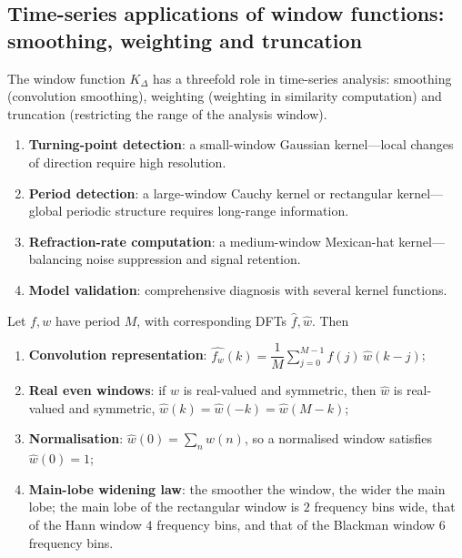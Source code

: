 \subsection{Time-series applications of window functions: smoothing, weighting and truncation}\label{sec:window_function_ts_app}
\begin{definition}\label{def:ts_window_function}
The window function $K_\Delta$ has a threefold role in time-series analysis: smoothing (convolution smoothing), weighting (weighting in similarity computation) and truncation (restricting the range of the analysis window).
\end{definition}

\begin{proposition}\label{prop:ts_window_selection}
\begin{enumerate}[label=(\roman*)]
    \item \textbf{Turning-point detection}: a small-window Gaussian kernel---local changes of direction require high resolution.
    \item \textbf{Period detection}: a large-window Cauchy kernel or rectangular kernel---global periodic structure requires long-range information.
    \item \textbf{Refraction-rate computation}: a medium-window Mexican-hat kernel---balancing noise suppression and signal retention.
    \item \textbf{Model validation}: comprehensive diagnosis with several kernel functions.
\end{enumerate}
\end{proposition}
\begin{proposition}\label{prop:window_spectrum_properties_parallel}
Let $f,w$ have period $M$, with corresponding DFTs $\hat f,\hat w$. Then
\begin{enumerate}[label=(\roman*)]
    \item \textbf{Convolution representation}: $\widehat{f_w}(k)=\dfrac1M\displaystyle\sum_{j=0}^{M-1}\hat f(j)\,\hat w(k-j)$;
    \item \textbf{Real even windows}: if $w$ is real-valued and symmetric, then $\hat w$ is real-valued and symmetric, $\hat w(k)=\hat w(-k)=\hat w(M-k)$;
    \item \textbf{Normalisation}: $\hat w(0)=\sum_{n}w(n)$, so a normalised window satisfies $\hat w(0)=1$;
    \item \textbf{Main-lobe widening law}: the smoother the window, the wider the main lobe; the main lobe of the rectangular window is $2$ frequency bins wide, that of the Hann window $4$ frequency bins, and that of the Blackman window $6$ frequency bins.
\end{enumerate}
\end{proposition}

